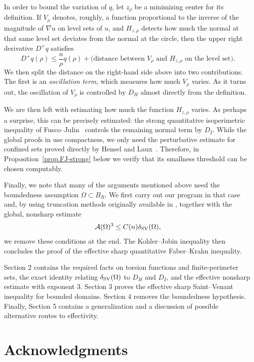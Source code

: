 \documentclass[11pt]{amsart}
\theoremstyle{plain}
\theoremstyle{definition}
\newcommand\SV{\mathop{\rm SV}}
\begin{document}
In order to bound the variation of $q$, let $z_\rho$ be a minimizing center for its definition. If $V_\rho$ denotes, roughly, a function proportional to the inverse of the magnitude of $\nabla u$ on level sets of $u$, and $H_{z,\rho}$ detects how much the normal at that same level set deviates from the normal at the circle, then the upper right derivative $D^+q$ satisfies
\[
  D^+q(\rho)
  \le \frac{n}{\rho} q(\rho)
  + (\text{distance between } V_\rho \text{ and } H_{z,\rho} \text{ on the level set)}.
\]
We then split the distance on the right-hand side above into two contributions. The first is an \emph{oscillation term}, which measures how much $V_{\rho}$ varies. As it turns out, the oscillation of $V_\rho$ is controlled by $D_H$ almost directly from the definition.

We are then left with estimating how much the function $H_{z,\rho}$ varies. As perhaps a surprise, this can be precisely estimated: the strong quantitative
isoperimetric inequality of Fusco--Julin~\cite{fusco2014strong} controls the
remaining normal term by $D_I$. While the global proofs in \cite{fusco2014strong,hensel2026quantitative}
use compactness, we only need the perturbative estimate for confined sets proved directly by Hensel and Laux~\cite[Theorem~2]{hensel2026quantitative}. Therefore, in Proposition~\ref{prop.FJ-strong} below we verify that its smallness threshold can be chosen computably.

Finally, we note that many of the arguments mentioned above need the boundedness assumption $\Omega\subset B_R$. We first carry out our program in that case and, by using truncation methods originally available in \cite{brasco2015faber}, together with the global, nonsharp estimate
\[
  \mathcal A(\Omega)^3\le C(n)\delta_{\SV}(\Omega),
\]
we remove these conditions at the end. The
Kohler--Jobin inequality then concludes the proof of the effective sharp
quantitative Faber--Krahn inequality.

 Section 2 contains the required facts on torsion functions and finite-perimeter
sets, the exact identity relating $\delta_{\SV}(\Omega)$ to $D_H$ and $D_I$,
and the effective nonsharp estimate with exponent $3$. Section 3 proves the
effective sharp Saint--Venant inequality for bounded domains. Section 4
removes the boundedness hypothesis. Finally, Section 5 contains a generalization and a discussion of possible alternative routes to effectivity.


\section*{Acknowledgments}
\end{document}
